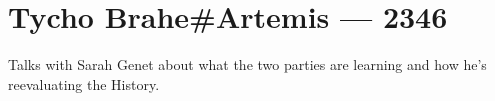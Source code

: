 \hypertarget{tycho-braheartemis-2346}{%
\chapter{Tycho Brahe\#Artemis — 2346}\label{tycho-braheartemis-2346}}

Talks with Sarah Genet about what the two parties are learning and how he's reevaluating the History.
